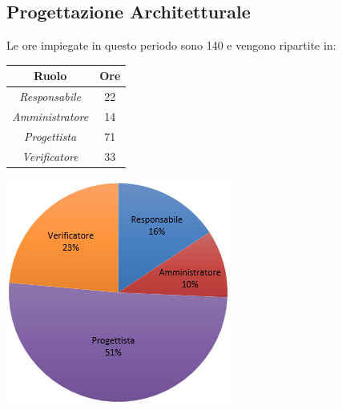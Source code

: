 \subsection{Progettazione Architetturale}
Le ore impiegate in questo periodo sono 140 e vengono ripartite in:
\begin{center}
  \centering
  \begin{tabular}{|c|c|}
    \hline
    \textbf{Ruolo} & \textbf{Ore} \\
    \hline
     \emph{Responsabile}  & 22 \\
    \hline  \emph{Amministratore}  & 14 \\
    \hline  \emph{Progettista}  & 71 \\
    \hline  \emph{Verificatore}  & 33 \\
    \hline
  \end{tabular}
  \includegraphics[scale=0.7]{img/grafico3.png}
\end{center}



